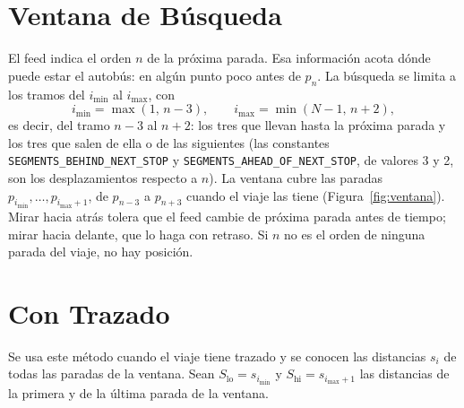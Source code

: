 \section{Ventana de Búsqueda}
\label{sec:ventana}

El feed indica el orden $n$ de la próxima parada. Esa información acota dónde puede estar el autobús: en algún punto
poco antes de $p_n$. La búsqueda se limita a los tramos del $i_{\min}$ al $i_{\max}$, con
\begin{equation}
\label{eq:ventana}
i_{\min}=\max(1,\,n-3),\qquad i_{\max}=\min(N-1,\,n+2),
\end{equation}
es decir, del tramo $n-3$ al $n+2$: los tres que llevan hasta la próxima parada y los tres que salen de ella o de
las siguientes (las constantes \texttt{SEGMENTS\_BEHIND\_NEXT\_STOP} y \texttt{SEGMENTS\_AHEAD\_OF\_NEXT\_STOP}, de
valores 3 y 2, son los desplazamientos respecto a $n$). La ventana cubre las paradas $p_{i_{\min}},\dots,p_{i_{\max}+1}$,
de $p_{n-3}$ a $p_{n+3}$ cuando el viaje las tiene (Figura~\ref{fig:ventana}). Mirar hacia atrás tolera que el feed
cambie de próxima parada antes de tiempo; mirar hacia delante, que lo haga con retraso. Si $n$ no es el orden de ninguna parada del viaje, no hay posición.

\section{Con Trazado}
\label{sec:trazado}

Se usa este método cuando el viaje tiene trazado y se conocen las distancias $s_i$ de todas las paradas de la
ventana. Sean $S_{\mathrm{lo}}=s_{i_{\min}}$ y $S_{\mathrm{hi}}=s_{i_{\max}+1}$ las distancias de la primera y de la
última parada de la ventana.

